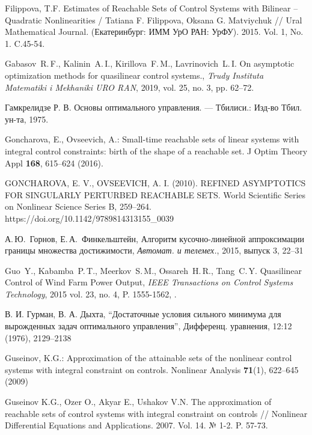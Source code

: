 \documentclass[../main.tex]{subfiles}
\begin{document}
\begin{thebibliography}{99}
Filippova, T.F. Estimates of Reachable Sets of Control Systems with Bilinear – Quadratic Nonlinearities / Tatiana F. Filippova, Oksana G. Matviychuk // Ural Mathematical Journal. (Екатеринбург: ИММ УрО РАН: УрФУ). 2015. Vol. 1, No. 1. C.45-54. 

Gabasov~R.\,F., Kalinin~A.\,I.,  Kirillova~F.\,M., Lavrinovich~L.\,I. On asymptotic optimization methods for quasilinear control systems., \emph{Trudy Instituta Matematiki i Mekhaniki URO
    RAN}, 2019, vol. 25, no. 3, pp. 62–72.
    
    Гамкрелидзе Р. В. Основы оптимального управления. — Тбилиси.: Изд-во Тбил. ун-та, 1975.
    
  Goncharova, E., Ovseevich, A.: Small-time reachable sets of linear systems with integral control constraints: birth of the shape of a reachable set. J Optim Theory Appl \textbf{168}, 615--624 (2016).
  
  GONCHAROVA, E. V.,  OVSEEVICH, A. I. (2010). REFINED ASYMPTOTICS FOR SINGULARLY PERTURBED REACHABLE SETS. World Scientific Series on Nonlinear Science Series B, 259–264. https://doi.org/10.1142/9789814313155\_0039
    
    А.\,Ю.~Горнов, Е.\,А.~Финкельштейн, Алгоритм кусочно-линейной аппроксимации границы множества достижимости, {\it Автомат. и телемех.}, 2015, выпуск 3, 22–31
   

Guo~Y., Kabamba~P.\,T., Meerkov~S.\,M.,  Ossareh~H.\,R., Tang~C.\,Y. Quasilinear Control of Wind Farm Power Output, \emph{IEEE Transactions on Control Systems Technology}, 2015 vol. 23, no. 4, P. 1555-1562,  .

В. И. Гурман, В. А. Дыхта, “Достаточные условия сильного минимума для вырожденных задач оптимального управления”, Дифференц. уравнения, 12:12 (1976), 2129–2138

Guseinov, K.G.: Approximation of the attainable sets of the nonlinear control systems with integral constraint on controls. Nonlinear Analysis \textbf{71}(1), 622--645 (2009) 

Guseinov K.G., Ozer O., Akyar E., Ushakov V.N. The approximation of reachable sets of control systems with integral constraint on controls // Nonlinear Differential Equations and Applications. 2007. Vol. 14. № 1-2. P. 57-73.


\end{thebibliography}
\end{document}
